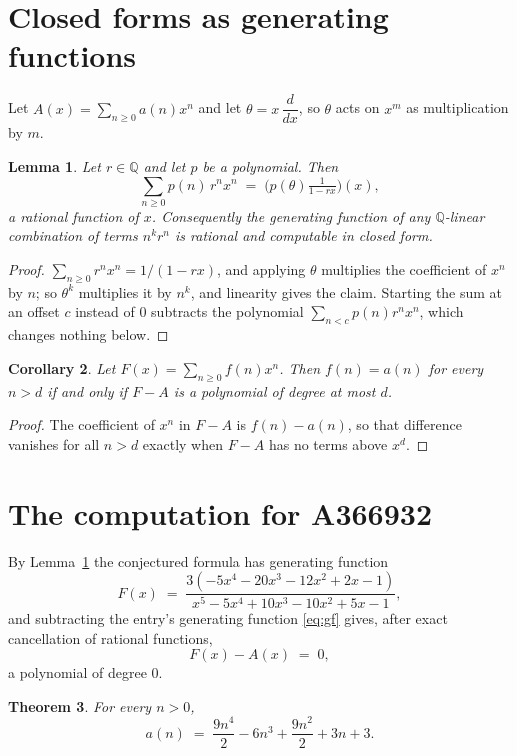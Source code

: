 \documentclass[11pt,a4paper]{article}
\theoremstyle{plain}
\newtheorem{theorem}{Theorem}
\newtheorem{lemma}[theorem]{Lemma}
\newtheorem{corollary}[theorem]{Corollary}
\theoremstyle{definition}
\begin{document}
\section{Closed forms as generating functions}

Let $A(x)=\sum_{n\ge 0}a(n)x^{n}$ and let $\theta=x\,\dfrac{d}{dx}$, so $\theta$
acts on $x^{m}$ as multiplication by $m$.

\begin{lemma}\label{lem:gf}
Let $r\in\mathbb{Q}$ and let $p$ be a polynomial. Then
\[
\sum_{n\ge0}p(n)\,r^{n}x^{n}\;=\;\bigl(p(\theta)\tfrac{1}{1-rx}\bigr)(x),
\]
a rational function of $x$. Consequently the generating function of any
$\mathbb{Q}$-linear combination of terms $n^{k}r^{n}$ is rational and computable in
closed form.
\end{lemma}

\begin{proof}
$\sum_{n\ge0}r^{n}x^{n}=1/(1-rx)$, and applying $\theta$ multiplies the coefficient of
$x^{n}$ by $n$; so $\theta^{k}$ multiplies it by $n^{k}$, and linearity gives the claim.
Starting the sum at an offset $c$ instead of $0$ subtracts the polynomial
$\sum_{n<c}p(n)r^{n}x^{n}$, which changes nothing below.
\end{proof}

\begin{corollary}\label{cor:criterion}
Let $F(x)=\sum_{n\ge 0}f(n)x^{n}$. Then $f(n)=a(n)$ for every $n>d$ if and only
if $F-A$ is a polynomial of degree at most $d$.
\end{corollary}

\begin{proof}
The coefficient of $x^{n}$ in $F-A$ is $f(n)-a(n)$, so that difference vanishes for all
$n>d$ exactly when $F-A$ has no terms above $x^{d}$.
\end{proof}

\section{The computation for A366932}

By Lemma~\ref{lem:gf} the conjectured formula has generating function
\[
F(x)\;=\;\frac{3 \left(- 5 x^{4} - 20 x^{3} - 12 x^{2} + 2 x - 1\right)}{x^{5} - 5 x^{4} + 10 x^{3} - 10 x^{2} + 5 x - 1} ,
\]
and subtracting the entry's generating function \eqref{eq:gf} gives, after exact
cancellation of rational functions,
\[
F(x)-A(x)\;=\;0 ,
\]
a polynomial of degree $0$.

\begin{theorem}
For every $n>0$,
\[
a(n)\;=\;\frac{9 n^{4}}{2} - 6 n^{3} + \frac{9 n^{2}}{2} + 3 n + 3 .
\]
\end{theorem}
\end{document}

